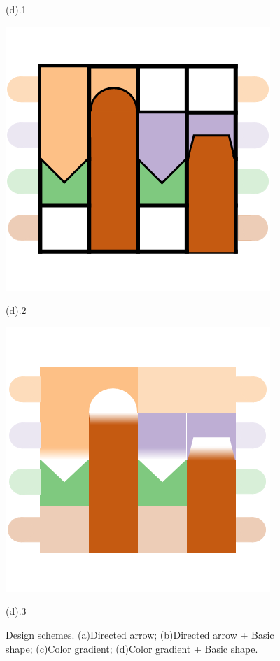 \documentclass[review,journal]{vgtc}         %
\begin{document}
\begin{figure}[h]
\begin{minipage}{0.24\linewidth}
		\vspace{-1pt}
		\centerline{(d).1}
		\centerline{\includegraphics[width=\textwidth]{Fig/42.png}}
		\vspace{-1pt}
		\centerline{(d).2}
		\centerline{\includegraphics[width=\textwidth]{Fig/43.png}}
		\vspace{-1pt}
		\centerline{(d).3}
	\end{minipage}
	\caption{Design schemes. (a)Directed arrow; (b)Directed arrow + Basic shape; (c)Color gradient; (d)Color gradient + Basic shape.}
	\label{fig:DC}
	\vspace{-0.5em}
\end{figure}
\end{document}
